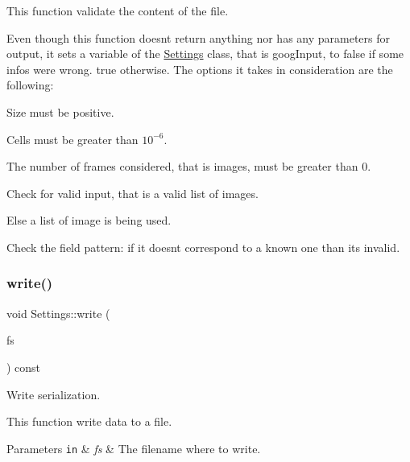 This function validate the content of the file. 

Even though this function doesn\textquotesingle{}t return anything nor has any parameters for output, it sets a variable of the {\ttfamily \mbox{\hyperlink{class_settings}{Settings}}} class, that is {\ttfamily goog\+Input}, to {\ttfamily false} if some infos were wrong. {\ttfamily true} otherwise. The options it takes in consideration are the following\+:
\begin{DoxyItemize}
\item Size must be positive.~\newline
 ~\newline
~\newline
~\newline
~\newline
~\newline

\item Cells must be greater than $10^{-6}$.
\item The number of frames considered, that is images, must be greater than 0.
\item Check for valid input, that is a valid list of images.
\item Else a list of image is being used.
\item Check the field pattern\+: if it doesn\textquotesingle{}t correspond to a known one than it\textquotesingle{}s invalid. 
\end{DoxyItemize}\mbox{\label{class_settings_a0785cc2055091b2a857b1dcefe291acc}} 
\subsubsection{\texorpdfstring{write()}{write()}}
{\footnotesize\ttfamily void Settings\+::write (\begin{DoxyParamCaption}\item[{File\+Storage \&}]{fs }\end{DoxyParamCaption}) const}



Write serialization. 

This function write data to a file.


\begin{DoxyParams}[1]{Parameters}
\mbox{\tt in}  & {\em fs} & The filename where to write. \\
\hline
\end{DoxyParams}


